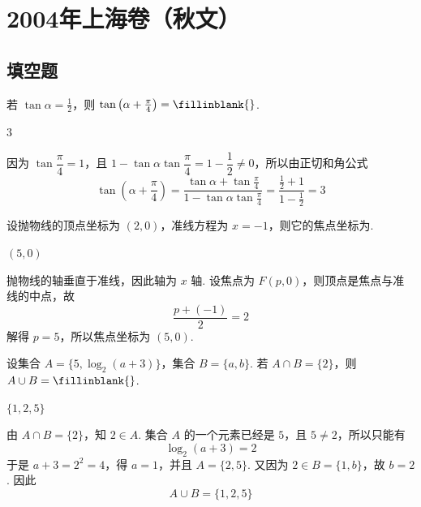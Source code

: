 \chapter{2004年上海卷（秋文）}
\section{填空题}
\begin{problem}
若 \(\tan \alpha = \frac{1}{2}\)，则 \(\tan \left(\alpha + \frac{\pi}{4}\right) =\fillinblank{}\).
\end{problem}

\begin{answer}
\(3\)
\end{answer}

\begin{solution}
因为 \(\tan\dfrac{\pi}{4}=1\)，且
\(1-\tan\alpha\tan\dfrac{\pi}{4}=1-\dfrac{1}{2}\ne0\)，所以由正切和角公式
\[
\tan\left(\alpha+\frac{\pi}{4}\right)
=\frac{\tan\alpha+\tan\frac{\pi}{4}}{1-\tan\alpha\tan\frac{\pi}{4}}
=\frac{\frac{1}{2}+1}{1-\frac{1}{2}}=3
\]
\end{solution}

\begin{problem}
设抛物线的顶点坐标为 \(\left(2,0\right)\)，准线方程为 \(x = -1\)，则它的焦点坐标为\fillinblank{}.
\end{problem}

\begin{answer}
\(\left(5,0\right)\)
\end{answer}

\begin{solution}
抛物线的轴垂直于准线，因此轴为 \(x\) 轴. 设焦点为 \(F\left(p,0\right)\)，则顶点是焦点与准线的中点，故
\[
\frac{p+(-1)}{2}=2
\]解得 \(p=5\)，所以焦点坐标为 \(\left(5,0\right)\).
\end{solution}

\begin{problem}
设集合 \(A = \{5, \log_2(a + 3)\}\)，集合 \(B = \{a, b\}\). 若 \(A \cap B = \{2\}\)，则 \(A \cup B =\fillinblank{}\).
\end{problem}

\begin{answer}
\(\{1,2,5\}\)
\end{answer}

\begin{solution}
由 \(A\cap B=\{2\}\)，知 \(2\in A\). 集合 \(A\) 的一个元素已经是 \(5\)，且 \(5\ne2\)，所以只能有
\[
\log_{2}(a+3)=2
\]于是 \(a+3=2^2=4\)，得 \(a=1\)，并且 \(A=\{2,5\}\). 又因为 \(2\in B=\{1,b\}\)，故 \(b=2\). 因此
\[
A\cup B=\{1,2,5\}
\]
\end{solution}

